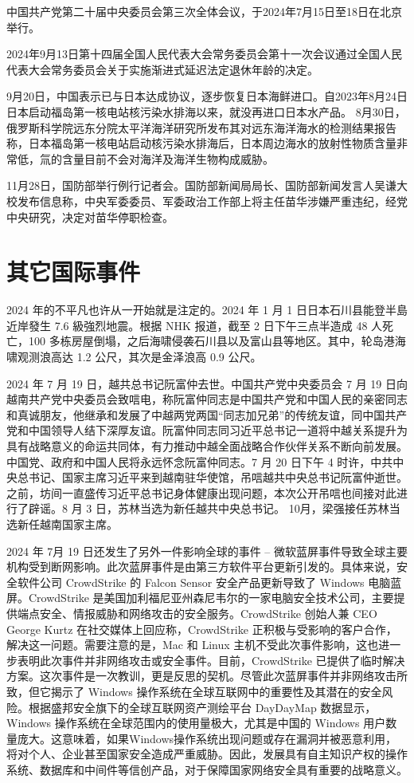 中国共产党第二十届中央委员会第三次全体会议，于2024年7月15日至18日在北京举行。

2024年9月13日第十四届全国人民代表大会常务委员会第十一次会议通过全国人民代表大会常务委员会关于实施渐进式延迟法定退休年龄的决定。

9月20日，中国表示已与日本达成协议，逐步恢复日本海鲜进口。自2023年8月24日日本启动福岛第一核电站核污染水排海以来，就没再进口日本水产品。 8月30日，俄罗斯科学院远东分院太平洋海洋研究所发布其对远东海洋海水的检测结果报告称，日本福岛第一核电站启动核污染水排海后，日本周边海水的放射性物质含量非常低，氚的含量目前不会对海洋及海洋生物构成威胁。

11月28日，国防部举行例行记者会。国防部新闻局局长、国防部新闻发言人吴谦大校发布信息称，中央军委委员、军委政治工作部上将主任苗华涉嫌严重违纪，经党中央研究，决定对苗华停职检查。

\section{其它国际事件}

2024 年的不平凡也许从一开始就是注定的。2024 年 1 月 1 日日本石川县能登半島近岸發生 7.6 級強烈地震。根据 NHK 报道，截至 2 日下午三点半造成 48 人死亡，100 多栋房屋倒塌，之后海啸侵袭石川县以及富山县等地区。其中，轮岛港海啸观测浪高达 1.2 公尺，其次是金泽浪高 0.9 公尺。

2024 年 7 月 19 日，越共总书记阮富仲去世。中国共产党中央委员会 7 月 19 日向越南共产党中央委员会致唁电，称阮富仲同志是中国共产党和中国人民的亲密同志和真诚朋友，他继承和发展了中越两党两国“同志加兄弟”的传统友谊，同中国共产党和中国领导人结下深厚友谊。阮富仲同志同习近平总书记一道将中越关系提升为具有战略意义的命运共同体，有力推动中越全面战略合作伙伴关系不断向前发展。中国党、政府和中国人民将永远怀念阮富仲同志。7 月 20 日下午 4 时许，中共中央总书记、国家主席习近平来到越南驻华使馆，吊唁越共中央总书记阮富仲逝世。之前，坊间一直盛传习近平总书记身体健康出现问题，本次公开吊唁也间接对此进行了辟谣。8 月 3 日，苏林当选为新任越共中央总书记。 10月，梁强接任苏林当选新任越南国家主席。

2024 年 7月 19 日还发生了另外一件影响全球的事件 -- 微软蓝屏事件导致全球主要机构受到断网影响。此次蓝屏事件是由第三方软件平台更新引发的。具体来说，安全软件公司 CrowdStrike 的 Falcon Sensor 安全产品更新导致了 Windows 电脑蓝屏。CrowdStrike 是美国加利福尼亚州森尼韦尔的一家电脑安全技术公司，主要提供端点安全、情报威胁和网络攻击的安全服务。CrowdStrike 创始人兼 CEO George Kurtz 在社交媒体上回应称，CrowdStrike 正积极与受影响的客户合作，解决这一问题。需要注意的是，Mac 和 Linux 主机不受此次事件影响，这也进一步表明此次事件并非网络攻击或安全事件。目前，CrowdStrike 已提供了临时解决方案。这次事件是一次教训，更是反思的契机。尽管此次蓝屏事件并非网络攻击所致，但它揭示了 Windows 操作系统在全球互联网中的重要性及其潜在的安全风险。根据盛邦安全旗下的全球互联网资产测绘平台 DayDayMap 数据显示，Windows 操作系统在全球范围内的使用量极大，尤其是中国的 Windows 用户数量庞大。这意味着，如果Windows操作系统出现问题或存在漏洞并被恶意利用，将对个人、企业甚至国家安全造成严重威胁。因此，发展具有自主知识产权的操作系统、数据库和中间件等信创产品，对于保障国家网络安全具有重要的战略意义。

